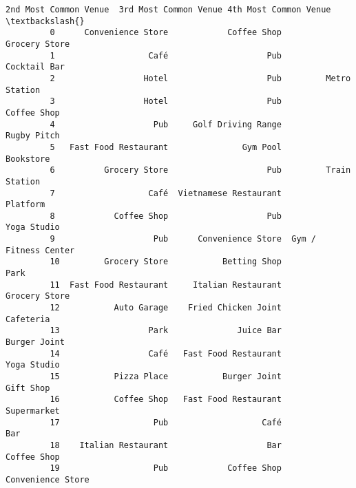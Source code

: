 \documentclass[11pt]{article}
\begin{document}
\begin{Verbatim}[commandchars=\\\{\}]
            2nd Most Common Venue  3rd Most Common Venue 4th Most Common Venue  \textbackslash{}
         0      Convenience Store            Coffee Shop         Grocery Store   
         1                   Café                    Pub          Cocktail Bar   
         2                  Hotel                    Pub         Metro Station   
         3                  Hotel                    Pub           Coffee Shop   
         4                    Pub     Golf Driving Range           Rugby Pitch   
         5   Fast Food Restaurant               Gym Pool             Bookstore   
         6          Grocery Store                    Pub         Train Station   
         7                   Café  Vietnamese Restaurant              Platform   
         8            Coffee Shop                    Pub           Yoga Studio   
         9                    Pub      Convenience Store  Gym / Fitness Center   
         10         Grocery Store           Betting Shop                  Park   
         11  Fast Food Restaurant     Italian Restaurant         Grocery Store   
         12           Auto Garage    Fried Chicken Joint             Cafeteria   
         13                  Park              Juice Bar          Burger Joint   
         14                  Café   Fast Food Restaurant           Yoga Studio   
         15           Pizza Place           Burger Joint             Gift Shop   
         16           Coffee Shop   Fast Food Restaurant           Supermarket   
         17                   Pub                   Café                   Bar   
         18    Italian Restaurant                    Bar           Coffee Shop   
         19                   Pub            Coffee Shop     Convenience Store   
         

\end{Verbatim}
\end{document}
